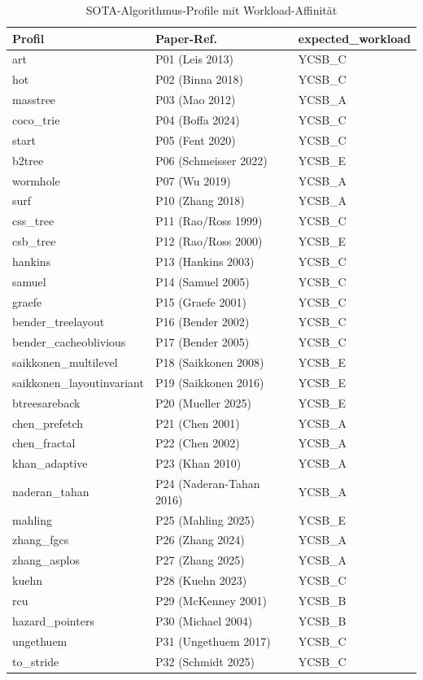 \begin{table}[!htbp]
\caption{SOTA-Algorithmus-Profile mit Workload-Affinität}\label{tab:sota-profiles}
\centering\small
\begin{tabular}{lll}
\toprule
\textbf{Profil} & \textbf{Paper-Ref.} & \textbf{expected\_workload} \\
\midrule
art & P01 (Leis 2013) & YCSB\_C \\
hot & P02 (Binna 2018) & YCSB\_C \\
masstree & P03 (Mao 2012) & YCSB\_A \\
coco\_trie & P04 (Boffa 2024) & YCSB\_C \\
start & P05 (Fent 2020) & YCSB\_C \\
b2tree & P06 (Schmeisser 2022) & YCSB\_E \\
wormhole & P07 (Wu 2019) & YCSB\_A \\
surf & P10 (Zhang 2018) & YCSB\_A \\
css\_tree & P11 (Rao/Ross 1999) & YCSB\_C \\
csb\_tree & P12 (Rao/Ross 2000) & YCSB\_E \\
hankins & P13 (Hankins 2003) & YCSB\_C \\
samuel & P14 (Samuel 2005) & YCSB\_C \\
graefe & P15 (Graefe 2001) & YCSB\_C \\
bender\_treelayout & P16 (Bender 2002) & YCSB\_C \\
bender\_cacheoblivious & P17 (Bender 2005) & YCSB\_C \\
saikkonen\_multilevel & P18 (Saikkonen 2008) & YCSB\_E \\
saikkonen\_layoutinvariant & P19 (Saikkonen 2016) & YCSB\_E \\
btreesareback & P20 (Mueller 2025) & YCSB\_E \\
chen\_prefetch & P21 (Chen 2001) & YCSB\_A \\
chen\_fractal & P22 (Chen 2002) & YCSB\_A \\
khan\_adaptive & P23 (Khan 2010) & YCSB\_A \\
naderan\_tahan & P24 (Naderan-Tahan 2016) & YCSB\_A \\
mahling & P25 (Mahling 2025) & YCSB\_E \\
zhang\_fgcs & P26 (Zhang 2024) & YCSB\_A \\
zhang\_asplos & P27 (Zhang 2025) & YCSB\_A \\
kuehn & P28 (Kuehn 2023) & YCSB\_C \\
rcu & P29 (McKenney 2001) & YCSB\_B \\
hazard\_pointers & P30 (Michael 2004) & YCSB\_B \\
ungethuem & P31 (Ungethuem 2017) & YCSB\_C \\
to\_stride & P32 (Schmidt 2025) & YCSB\_C \\
\bottomrule
\end{tabular}
\end{table}

